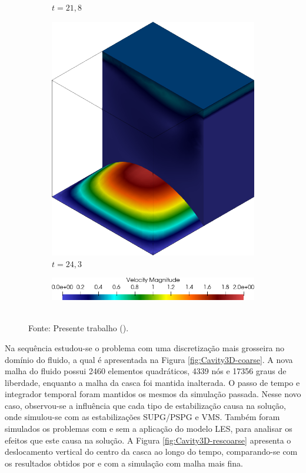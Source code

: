 \begin{figure}[h!]
\begin{subfigure}[b]{0.35\textwidth}
        \caption{$t=21,8$}
    \end{subfigure}
    \begin{subfigure}[b]{0.35\textwidth}
        \includegraphics[width=\linewidth]{Figuras/FSI-Cavity3D/u24-3.png}
        \caption{$t=24,3$}
    \end{subfigure}
    \begin{subfigure}[b]{0.5\textwidth}
        \includegraphics[width=\linewidth]{Figuras/FSI-Cavity3D/lu.png}
    \end{subfigure}
    \\Fonte: Presente trabalho (\the\year).
    \label{fig:Cavity3D-vel}
\end{figure}

Na sequência estudou-se o problema com uma discretização mais grosseira no domínio do fluido, a qual é apresentada na Figura \ref{fig:Cavity3D-coarse}. A nova malha do fluido possui 2460 elementos quadráticos, 4339 nós e 17356 graus de liberdade, enquanto a malha da casca foi mantida inalterada. O passo de tempo e integrador temporal foram mantidos os mesmos da simulação passada. Nesse novo caso, observou-se a influência que cada tipo de estabilização causa na solução, onde simulou-se com as estabilizações SUPG/PSPG e VMS. Também foram simulados os problemas com e sem a aplicação do modelo LES, para analisar os efeitos que este causa na solução. A Figura \ref{fig:Cavity3D-rescoarse} apresenta o deslocamento vertical do centro da casca ao longo do tempo, comparando-se com os resultados obtidos por  e com a simulação com malha mais fina.

